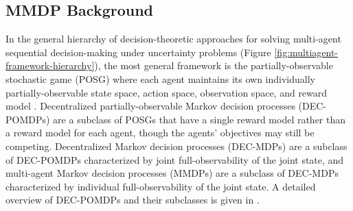 \documentclass[letterpaper]{article}%
\begin{document}
\subsection{MMDP Background}

In the general hierarchy of decision-theoretic approaches for solving multi-agent sequential decision-making under uncertainty problems (Figure \ref{fig:multiagent-framework-hierarchy}), the most general framework is the partially-observable stochastic game (POSG) where each agent maintains its own individually partially-observable state space, action space, observation space, and reward model \cite{Hansen2004DynamicGames}. Decentralized partially-observable Markov decision processes (DEC-POMDPs) are a subclass of POSGs that have a single reward model rather than a reward model for each agent, though the agents' objectives may still be competing. Decentralized Markov decision processes (DEC-MDPs) are a subclass of DEC-POMDPs characterized by joint full-observability of the joint state, and multi-agent Markov decision processes (MMDPs) are a subclass of DEC-MDPs characterized by individual full-observability of the joint state. A detailed overview of DEC-POMDPs and their subclasses is given in \citeauthor{doi:10.1002/9781118557426.ch9} \citeyear{doi:10.1002/9781118557426.ch9}.
\end{document}
